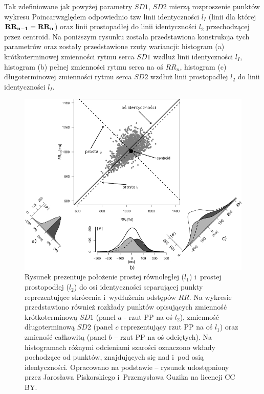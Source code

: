 Tak zdefiniowane jak powyżej parametry $SD1$, $SD2$ mierzą rozproszenie punktów wykresu
Poincar\ee względem odpowiednio tzw linii identyczności $l_{I}$ (linii dla której $\mathbf{RR_{n-1}} = \mathbf{RR_n}$)
oraz linii prostopadłej do linii identyczności $l_2$ przechodzącej przez centroid. Na
poniższym rysunku została przedstawiona konstrukcja tych parametrów oraz zostały
przedstawione rzuty wariancji: histogram (a) krótkoterminowej zmienności rytmu serca $SD1$
wzdłuż linii identyczności $l_{I}$, histogram (b) pełnej zmienności rytmu serca na oś $RR_n$,
histogram (c) długoterminowej zmienności rytmu serca $SD2$ wzdłuż linii prostopadłej $l_2$
do linii identyczności $l_{I}$.

\begin{figure}
\centering
\includegraphics[width=\textwidth]{graph/pp_distrib.jpg}
\caption{Rysunek prezentuje położenie prostej równoległej ($l_1$) i~prostej prostopodłej ($l_2$) do osi identyczności separującej punkty reprezentujące skrócenia i~wydłużenia odstępów $RR$. Na wykresie przedstawiono również rozkłady punktów opisujących zmienność krótkoterminową $SD1$ (panel $a$ - rzut PP na oś $l_2$), zmienność długoterminową $SD2$ (panel $c$ reprezentujący rzut PP na oś $l_1$) oraz zmieność całkowitą (panel $b$ -- rzut PP na oś odciętych). Na histogramach różnymi odcieniami szarości oznaczono wkłady pochodzące od punktów, znajdujących się nad i~pod osią identyczności. Opracowano na podstawie \cite{hrstruct} -- rysunek udostępniony przez Jarosława Piskorskiego i~Przemysława Guzika na licencji CC BY.}
\label{fig:pp_distrib}
\end{figure}
  
